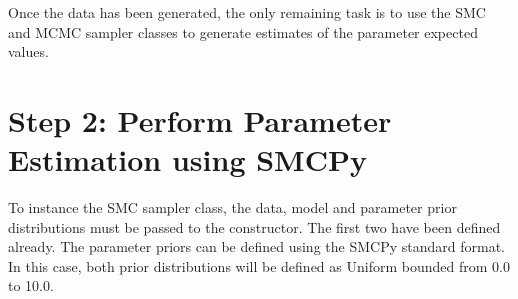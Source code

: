 \documentclass[letterpaper,10pt,english]{sphinxmanual}
\begin{document}
\begin{sphinxVerbatim}[commandchars=\\\{\}]
  \PYG{p}{[} \PYG{p}{]}                        
      
   

     

  
   
\end{sphinxVerbatim}

Once the data has been generated, the only remaining task is to use the SMC and MCMC sampler classes to generate estimates of the parameter expected values.


\section{Step 2: Perform Parameter Estimation using SMCPy}
\label{\detokenize{example:step-2-perform-parameter-estimation-using-smcpy}}
To instance the SMC sampler class, the data, model and parameter prior
distributions must be passed to the constructor. The first two have been
defined already. The parameter priors can be defined using the SMCPy standard
format. In this case, both prior distributions will be defined as Uniform
bounded from 0.0 to 10.0.

\begin{sphinxVerbatim}[commandchars=\\\{\}]
   \PYG{p}{[}  \PYG{p}{]}
                 \PYG{p}{[}  \PYG{p}{]}
\end{sphinxVerbatim}
\end{document}
